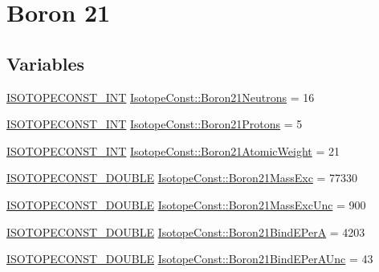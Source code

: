 \hypertarget{group___isotope_const-_boron-_b21}{}\section{Boron 21}
\label{group___isotope_const-_boron-_b21}
\subsection*{Variables}
\begin{DoxyCompactItemize}
\item 
\mbox{\hyperlink{group___isotope_const-_macros_ga5f18360b3e99483a35c32d789e62621c}{I\+S\+O\+T\+O\+P\+E\+C\+O\+N\+S\+T\+\_\+\+I\+NT}} \mbox{\hyperlink{group___isotope_const-_boron-_b21_ga89abaca7d1f4e01a6f3b89b03b1a0e23}{Isotope\+Const\+::\+Boron21\+Neutrons}} = 16
\item 
\mbox{\hyperlink{group___isotope_const-_macros_ga5f18360b3e99483a35c32d789e62621c}{I\+S\+O\+T\+O\+P\+E\+C\+O\+N\+S\+T\+\_\+\+I\+NT}} \mbox{\hyperlink{group___isotope_const-_boron-_b21_ga9bd29c1d85290dbe055561a6a8a50c17}{Isotope\+Const\+::\+Boron21\+Protons}} = 5
\item 
\mbox{\hyperlink{group___isotope_const-_macros_ga5f18360b3e99483a35c32d789e62621c}{I\+S\+O\+T\+O\+P\+E\+C\+O\+N\+S\+T\+\_\+\+I\+NT}} \mbox{\hyperlink{group___isotope_const-_boron-_b21_ga923d8b7030de536c29de711d1dedc228}{Isotope\+Const\+::\+Boron21\+Atomic\+Weight}} = 21
\item 
\mbox{\hyperlink{group___isotope_const-_macros_ga8f45a7272ce02c0b4c65c44636ed719a}{I\+S\+O\+T\+O\+P\+E\+C\+O\+N\+S\+T\+\_\+\+D\+O\+U\+B\+LE}} \mbox{\hyperlink{group___isotope_const-_boron-_b21_ga6c5540d651c7ddf5c3b5e242d726952e}{Isotope\+Const\+::\+Boron21\+Mass\+Exc}} = 77330
\item 
\mbox{\hyperlink{group___isotope_const-_macros_ga8f45a7272ce02c0b4c65c44636ed719a}{I\+S\+O\+T\+O\+P\+E\+C\+O\+N\+S\+T\+\_\+\+D\+O\+U\+B\+LE}} \mbox{\hyperlink{group___isotope_const-_boron-_b21_ga816a3a8029612214b812e026641a2326}{Isotope\+Const\+::\+Boron21\+Mass\+Exc\+Unc}} = 900
\item 
\mbox{\hyperlink{group___isotope_const-_macros_ga8f45a7272ce02c0b4c65c44636ed719a}{I\+S\+O\+T\+O\+P\+E\+C\+O\+N\+S\+T\+\_\+\+D\+O\+U\+B\+LE}} \mbox{\hyperlink{group___isotope_const-_boron-_b21_gac24a50efe4fc004d78bf8876ba5817ec}{Isotope\+Const\+::\+Boron21\+Bind\+E\+PerA}} = 4203
\item 
\mbox{\hyperlink{group___isotope_const-_macros_ga8f45a7272ce02c0b4c65c44636ed719a}{I\+S\+O\+T\+O\+P\+E\+C\+O\+N\+S\+T\+\_\+\+D\+O\+U\+B\+LE}} \mbox{\hyperlink{group___isotope_const-_boron-_b21_gac3bad56e53a10a4472e30358647033c9}{Isotope\+Const\+::\+Boron21\+Bind\+E\+Per\+A\+Unc}} = 43

\end{DoxyCompactItemize}
